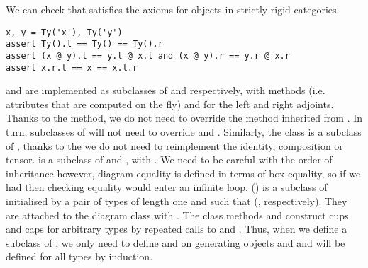 \begin{example}
We can check that  satisfies the axioms for objects in strictly rigid categories.

\begin{verbatim}
x, y = Ty('x'), Ty('y')
assert Ty().l == Ty() == Ty().r
assert (x @ y).l == y.l @ x.l and (x @ y).r == y.r @ x.r
assert x.r.l == x == x.l.r
\end{verbatim}
\end{example}

 and  are implemented as subclasses of  and  respectively, with  methods (i.e. attributes that are computed on the fly)  and  for the left and right adjoints.
Thanks to the  method, we do not need to override the  method inherited from .
In turn, subclasses of  will not need to override  and .
Similarly, the  class is a subclass of , thanks to the  we do not need to reimplement the identity, composition or tensor.
 is a subclass of  and , with .
We need to be careful with the order of inheritance however, diagram equality is defined in terms of box equality, so if we had  then checking equality would enter an infinite loop.
 () is a subclass of  initialised by a pair of types of length one  and  such that  (, respectively).
They are attached to the diagram class with .
The class methods  and  construct cups and caps for arbitrary types by repeated calls to  and .
Thus, when we define a subclass of , we only need to define  and  on generating objects and  and  will be defined for all types by induction.


